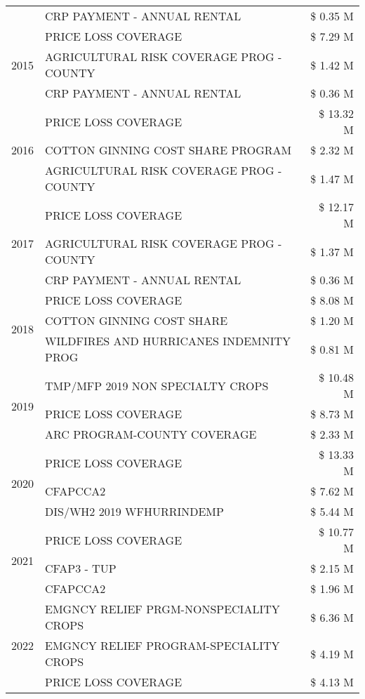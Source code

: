\begin{tabular}{llr}
 & CRP PAYMENT - ANNUAL RENTAL & \$ 0.35 M \\
\cline{1-3}
\multirow[t]{3}{*}{2015} & PRICE LOSS COVERAGE & \$ 7.29 M \\
 & AGRICULTURAL RISK COVERAGE PROG - COUNTY & \$ 1.42 M \\
 & CRP PAYMENT - ANNUAL RENTAL & \$ 0.36 M \\
\cline{1-3}
\multirow[t]{3}{*}{2016} & PRICE LOSS COVERAGE & \$ 13.32 M \\
 & COTTON GINNING COST SHARE PROGRAM & \$ 2.32 M \\
 & AGRICULTURAL RISK COVERAGE PROG - COUNTY & \$ 1.47 M \\
\cline{1-3}
\multirow[t]{3}{*}{2017} & PRICE LOSS COVERAGE & \$ 12.17 M \\
 & AGRICULTURAL RISK COVERAGE PROG - COUNTY & \$ 1.37 M \\
 & CRP PAYMENT - ANNUAL RENTAL & \$ 0.36 M \\
\cline{1-3}
\multirow[t]{3}{*}{2018} & PRICE LOSS COVERAGE & \$ 8.08 M \\
 & COTTON GINNING COST SHARE & \$ 1.20 M \\
 & WILDFIRES AND HURRICANES INDEMNITY PROG & \$ 0.81 M \\
\cline{1-3}
\multirow[t]{3}{*}{2019} & TMP/MFP 2019 NON SPECIALTY CROPS & \$ 10.48 M \\
 & PRICE LOSS COVERAGE & \$ 8.73 M \\
 & ARC PROGRAM-COUNTY COVERAGE & \$ 2.33 M \\
\cline{1-3}
\multirow[t]{3}{*}{2020} & PRICE LOSS COVERAGE & \$ 13.33 M \\
 & CFAPCCA2 & \$ 7.62 M \\
 & DIS/WH2 2019 WFHURRINDEMP & \$ 5.44 M \\
\cline{1-3}
\multirow[t]{3}{*}{2021} & PRICE LOSS COVERAGE & \$ 10.77 M \\
 & CFAP3 - TUP & \$ 2.15 M \\
 & CFAPCCA2 & \$ 1.96 M \\
\cline{1-3}
\multirow[t]{3}{*}{2022} & EMGNCY RELIEF PRGM-NONSPECIALITY CROPS & \$ 6.36 M \\
 & EMGNCY RELIEF PROGRAM-SPECIALITY CROPS & \$ 4.19 M \\
 & PRICE LOSS COVERAGE & \$ 4.13 M \\
\cline{1-3}
\bottomrule
\end{tabular}

